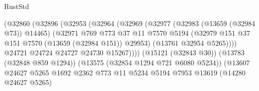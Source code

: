 \begin{lexlean}{RustStd}
\begin{coremodule}
                                            (@32860
                                              (@32896
                                                (@32953
                                                  (@32964
                                                    (@32969
                                                      (@32977
                                                        (@32983 (@13659 (@32984 @73)) @14465)
                                                        (@32971
                                                          @769
                                                          @773
                                                          @37
                                                          @11
                                                          @7570
                                                          @5194
                                                          (@32979
                                                            @151
                                                            @37
                                                            @151
                                                            @7570
                                                            (@13659 (@32984 @151))
                                                            @29953)
                                                          (@13761 @32954 @5265))))
                                                    @24721
                                                    @24724
                                                    @24727
                                                    @24730
                                                    @15267))))
                                            (@15121 (@32843 @30))
                                            (@13783 (@32848 @859 @1294))
                                            (@13575 (@32854 @1294 @721 @6080 @5234))
                                            (@13607
                                              @24627
                                              @5265
                                              @1692
                                              @2362
                                              @773
                                              @11
                                              @5234
                                              @5194
                                              @7953
                                              @13619
                                              (@14280 @24627 @5265)

\end{coremodule}
\end{lexlean}
